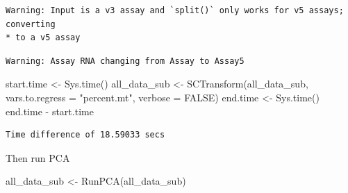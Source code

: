 \documentclass[
  letterpaper,
  DIV=11,
  numbers=noendperiod]{scrreprt}
\newenvironment{Shaded}{\begin{snugshade}}{\end{snugshade}}
\newcommand{\AttributeTok}[1]{\textcolor[rgb]{0.40,0.45,0.13}{#1}}
\newcommand{\ConstantTok}[1]{\textcolor[rgb]{0.56,0.35,0.01}{#1}}
\newcommand{\FunctionTok}[1]{\textcolor[rgb]{0.28,0.35,0.67}{#1}}
\newcommand{\NormalTok}[1]{\textcolor[rgb]{0.00,0.23,0.31}{#1}}
\newcommand{\OtherTok}[1]{\textcolor[rgb]{0.00,0.23,0.31}{#1}}
\newcommand{\SpecialCharTok}[1]{\textcolor[rgb]{0.37,0.37,0.37}{#1}}
\newcommand{\StringTok}[1]{\textcolor[rgb]{0.13,0.47,0.30}{#1}}
\begin{document}
\begin{Shaded}
\end{Shaded}

\begin{verbatim}
Warning: Input is a v3 assay and `split()` only works for v5 assays; converting
* to a v5 assay
\end{verbatim}

\begin{verbatim}
Warning: Assay RNA changing from Assay to Assay5
\end{verbatim}

\begin{Shaded}
\begin{Highlighting}[]
\NormalTok{start.time }\OtherTok{\textless{}{-}} \FunctionTok{Sys.time}\NormalTok{()}
\NormalTok{all\_data\_sub }\OtherTok{\textless{}{-}} \FunctionTok{SCTransform}\NormalTok{(all\_data\_sub, }\AttributeTok{vars.to.regress =} \StringTok{"percent.mt"}\NormalTok{, }\AttributeTok{verbose =} \ConstantTok{FALSE}\NormalTok{)}
\NormalTok{end.time }\OtherTok{\textless{}{-}} \FunctionTok{Sys.time}\NormalTok{()}
\NormalTok{end.time }\SpecialCharTok{{-}}\NormalTok{ start.time}
\end{Highlighting}
\end{Shaded}

\begin{verbatim}
Time difference of 18.59033 secs
\end{verbatim}

Then run PCA

\begin{Shaded}
\begin{Highlighting}[]
\NormalTok{all\_data\_sub }\OtherTok{\textless{}{-}} \FunctionTok{RunPCA}\NormalTok{(all\_data\_sub)}
\end{Highlighting}
\end{Shaded}
\end{document}
